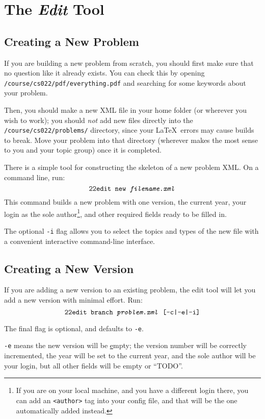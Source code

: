 \section{The \textit{Edit} Tool}
  \subsection{Creating a New Problem}
    If you are building a new problem from scratch, you should first make 
    sure that no question like it already exists. You can check this by 
    opening \texttt{/course/cs022/pdf/everything.pdf} and searching 
    for some keywords about your problem. 
    
    Then, you should make a new XML file in your home folder (or wherever
    you wish to work); you should \textit{not} add new files directly into
    the \texttt{/course/cs022/problems/} directory, since your \LaTeX\ 
    errors may cause builds to break. Move your problem into that directory
    (wherever makes the most sense to you and your topic group) once it is
    completed.
    
    There is a simple tool for constructing the skeleton of a new problem 
    XML. On a command line, run: 
    \[\texttt{22edit }\texttt{new \textit{filename.xml}}\] 
    This command builds a new problem with one version, the current year, 
    your login as the sole 
    author\footnote{If you are on your local machine, and you have a
    different login there, you can add an \texttt{<author>} tag into your
    config file, and that will be the one automatically added instead.}, 
    and other required fields ready to be filled in.
    
    The optional \texttt{-i} flag allows you to select the topics and 
    types of the new file with a convenient interactive command-line interface. 
    
  \subsection{Creating a New Version}
    If you are adding a new version to an existing problem, the edit tool 
    will let you add a new version with minimal effort. Run: 
    \[\texttt{22edit }\texttt{branch \textit{problem.xml} [-c|-e|-i]}\]
    
    The final flag is optional, and defaults to \texttt{-e}.
    
    \texttt{-e} means the new version will be \underline{e}mpty; the 
    version number will be correctly incremented, the year will be set to 
    the current year, and the sole author will be your login, but all 
    other fields will be empty or ``TODO''.
    
